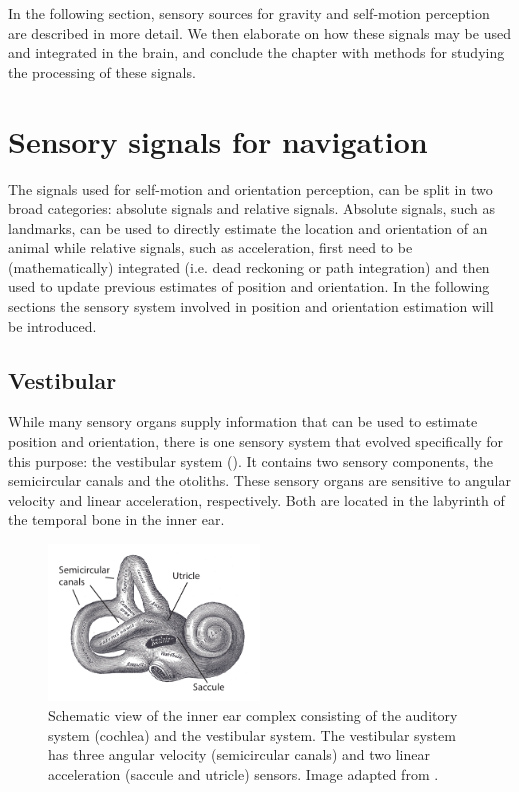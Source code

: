 In the following section, sensory sources for gravity and self-motion perception are described in more detail. We then elaborate on how these signals may be used and integrated in the brain, and conclude the chapter with methods for studying the processing of these signals.



\section{Sensory signals for navigation}

The signals used for self-motion and orientation perception, can be split in two broad categories: absolute signals and relative signals. Absolute signals, such as landmarks, can be used to directly estimate the location and orientation of an animal while relative signals, such as acceleration, first need to be (mathematically) integrated (i.e. dead reckoning or path integration) and then used to update previous estimates of position and orientation. In the following sections the sensory system involved in position and orientation estimation will be introduced.

\subsection{Vestibular}

While many sensory organs supply information that can be used to estimate position and orientation, there is one sensory system that evolved specifically for this purpose: the vestibular system (). It contains two sensory components, the semicircular canals and the otoliths. These sensory organs are sensitive to angular velocity and linear acceleration, respectively. Both are located in the labyrinth of the temporal bone in the inner ear.

\begin{figure}
    \includegraphics[width=0.5\textwidth]{src/intro/figures/vestibular.pdf}
    \caption{Schematic view of the inner ear complex consisting of the auditory system (cochlea) and the vestibular system. The vestibular system has three angular velocity (semicircular canals) and two linear acceleration (saccule and utricle) sensors. Image adapted from \protect{}.}
    \label{intro:vestibular}
\end{figure}


